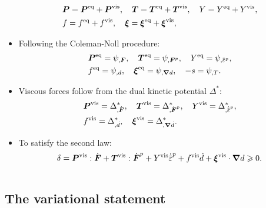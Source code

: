 \begin{frame}
\begin{columns}
\begin{column}{0.6\textwidth}
\begin{itemize}
              \begin{align*}
                 & \boldsymbol{P} = \boldsymbol{P}^\text{eq} + \boldsymbol{P}^\text{vis}, \quad \boldsymbol{T} = \boldsymbol{T}^\text{eq} + \boldsymbol{T}^\text{vis}, \quad Y = Y^\text{eq} + Y^\text{vis}, \\
                 & f = f^\text{eq} + f^\text{vis}, \quad \boldsymbol{\xi} = \boldsymbol{\xi}^\text{eq} + \boldsymbol{\xi}^\text{vis},                                    
              \end{align*}
        \item Following the Coleman-Noll procedure:
              \begin{align*}
                 & \bfP^\text{eq} = \psi_{,\defgrad}, \quad \bfT^\text{eq} = \psi_{,\defgrad^p}, \quad Y^\text{eq} = \psi_{,\ep}, \\
                 & f^\text{eq} = \psi_{,d}, \quad \bs{\xi}^\text{eq} = \psi_{,\grad d}, \quad -s = \psi_{,T}.                     
              \end{align*}
        \item Viscous forces follow from the dual kinetic potential $\Delta^*$:
              \begin{align*}
                 & \bfP^\text{vis} = \Delta^*_{,\dot{\defgrad}}, \quad \bfT^\text{vis} = \Delta^*_{,\dot{\defgrad}^p}, \quad Y^\text{vis} = \Delta^*_{,\epdot}, \\
                 & f^\text{vis} = \Delta^*_{,\dot{d}}, \quad \bs{\xi}^\text{vis} = \Delta^*_{,\grad\dot{d}}.                                                    
              \end{align*}
        \item To satisfy the second law:
              \begin{align*}
                \delta = \bfP^\text{vis}:\dot{\defgrad} + \bfT^\text{vis}:\dot{\defgrad}^p + Y^\text{vis}\epdot + f^\text{vis}\dot{d} + \bs{\xi}^\text{vis}\cdot\grad d \geqslant 0.
              \end{align*}
      \end{itemize}
    \end{column}
  \end{columns}
\end{frame}

\subsection{The variational statement}

